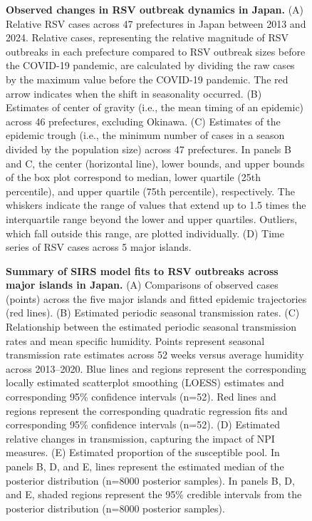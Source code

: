 \documentclass[12pt]{article}
\begin{document}
\begin{figure}[!th]
\caption{
\textbf{Observed changes in RSV outbreak dynamics in Japan.}
(A) Relative RSV cases across 47 prefectures in Japan between 2013 and 2024.
Relative cases, representing the relative magnitude of RSV outbreaks in each prefecture compared to RSV outbreak sizes before the COVID-19 pandemic, are calculated by dividing the raw cases by the maximum value before the COVID-19 pandemic.
The red arrow indicates when the shift in seasonality occurred.
(B) Estimates of center of gravity (i.e., the mean timing of an epidemic) across 46 prefectures, excluding Okinawa.
(C) Estimates of the epidemic trough (i.e., the minimum number of cases in a season divided by the population size) across 47 prefectures.
In panels B and C, the center (horizontal line), lower bounds, and upper bounds of the box plot correspond to median, lower quartile (25th percentile), and upper quartile (75th percentile), respectively.
The whiskers indicate the range of values that extend up to 1.5 times the interquartile range beyond the lower and upper quartiles.
Outliers, which fall outside this range, are plotted individually. 
(D) Time series of RSV cases across 5 major islands.
}
\label{fig:fig1}
\end{figure}

\begin{figure}[!th]
\caption{
\textbf{Summary of SIRS model fits to RSV outbreaks across major islands in Japan.}
(A) Comparisons of observed cases (points) across the five major islands and fitted epidemic trajectories (red lines).
(B) Estimated periodic seasonal transmission rates.
(C) Relationship between the estimated periodic seasonal transmission rates and mean specific humidity.
Points represent seasonal transmission rate estimates across 52 weeks versus average humidity across 2013--2020.
Blue lines and regions represent the corresponding locally estimated scatterplot smoothing (LOESS) estimates and corresponding 95\%  confidence intervals (n=52).
Red lines and regions represent the corresponding quadratic regression fits and corresponding 95\% confidence intervals (n=52).
(D) Estimated relative changes in transmission, capturing the impact of NPI measures.
(E) Estimated proportion of the susceptible pool.
In panels B, D, and E, lines represent the estimated median of the posterior distribution (n=8000 posterior samples).
In panels B, D, and E, shaded regions represent the 95\% credible intervals from the posterior distribution (n=8000 posterior samples).
}
\label{fig:fig2}
\end{figure}
\end{document}
